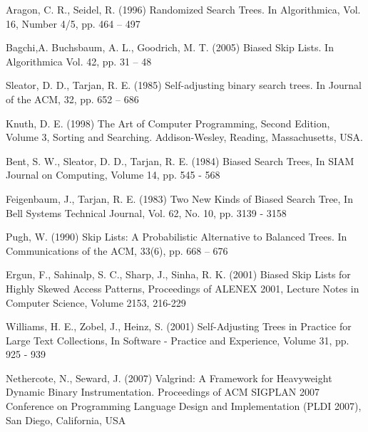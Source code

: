 \documentclass[mcs]{scsthesis}
\begin{document}
\begin{thebibliography}{5}

Aragon, C. R.,  Seidel, R. (1996) Randomized Search Trees.
In Algorithmica, Vol. 16, Number 4/5, pp. 464 – 497

Bagchi,A. Buchsbaum, A. L., Goodrich, M. T. (2005) Biased Skip Lists.
In Algorithmica Vol. 42, pp. 31 – 48
 
Sleator, D. D., Tarjan, R. E. (1985) Self-adjusting binary search trees.
In Journal of the ACM, 32, pp. 652 – 686

Knuth, D. E. (1998) The Art of Computer Programming, Second Edition,
Volume 3, Sorting and Searching.  Addison-Wesley, Reading, Massachusetts, USA.

Bent, S. W., Sleator, D. D., Tarjan, R. E. (1984) Biased Search Trees,
In SIAM Journal on Computing, Volume 14, pp. 545 - 568

Feigenbaum, J., Tarjan, R. E. (1983) Two New Kinds of Biased Search Tree,
In Bell Systems Technical Journal, Vol. 62, No. 10, pp. 3139 - 3158

Pugh, W. (1990) Skip Lists: A Probabilistic Alternative to Balanced Trees.
In Communications of the ACM, 33(6), pp. 668 – 676

Ergun, F., Sahinalp, S. C., Sharp, J., Sinha, R. K. (2001) Biased Skip Lists
for Highly Skewed Access Patterns, Proceedings of ALENEX 2001, Lecture Notes in
Computer Science, Volume 2153, 216-229

Williams, H. E., Zobel, J., Heinz, S. (2001) Self-Adjusting Trees in Practice
for Large Text Collections, In Software - Practice and Experience,
Volume 31, pp. 925 - 939

Nethercote, N., Seward, J. (2007) Valgrind: A Framework for Heavyweight Dynamic
Binary Instrumentation.  Proceedings of ACM SIGPLAN 2007 Conference on
Programming Language Design and Implementation (PLDI 2007),
San Diego, California, USA

\end{thebibliography}
\end{document}
